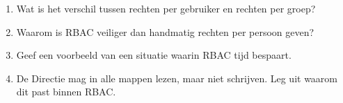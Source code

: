 \begin{enumerate}
\item Wat is het verschil tussen rechten per gebruiker en rechten per groep?
\item Waarom is RBAC veiliger dan handmatig rechten per persoon geven?
\item Geef een voorbeeld van een situatie waarin RBAC tijd bespaart.
\item De Directie mag in alle mappen lezen, maar niet schrijven. Leg uit waarom dit past binnen RBAC.
\end{enumerate}

